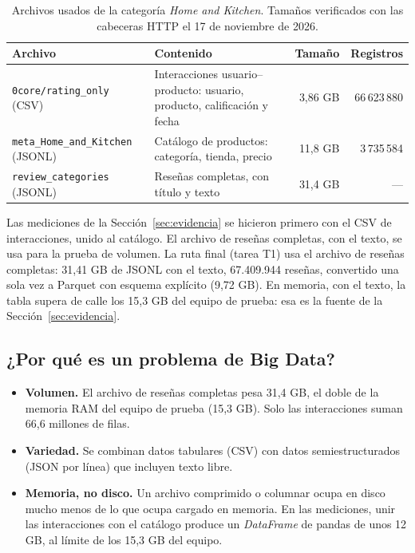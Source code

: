 \documentclass[11pt,a4paper]{article}
\begin{document}
\begin{table}[H]
\centering
\caption{Archivos usados de la categoría \emph{Home and Kitchen}. Tamaños verificados con
las cabeceras HTTP el 17 de noviembre de 2026.}
\label{tab:datos}
\begin{tabularx}{\textwidth}{lXrr}
\toprule
Archivo & Contenido & Tamaño & Registros \\
\midrule
\texttt{0core/rating\_only} (CSV) & Interacciones usuario--producto: usuario, producto, calificación y fecha & 3,86 GB & 66\,623\,880 \\
\texttt{meta\_Home\_and\_Kitchen} (JSONL) & Catálogo de productos: categoría, tienda, precio & 11,8 GB & 3\,735\,584 \\
\texttt{review\_categories} (JSONL) & Reseñas completas, con título y texto & 31,4 GB & --- \\
\bottomrule
\end{tabularx}
\end{table}

Las mediciones de la Sección~\ref{sec:evidencia} se hicieron primero con el CSV de
interacciones, unido al catálogo. El archivo de reseñas completas, con el texto, se usa
para la prueba de volumen. La ruta final (tarea T1) usa el archivo de reseñas completas:
31,41 GB de JSONL con el texto, 67.409.944 reseñas, convertido una sola vez a Parquet con
esquema explícito (9,72 GB). En memoria, con el texto, la tabla supera de calle los 15,3 GB
del equipo de prueba: esa es la fuente de la Sección~\ref{sec:evidencia}.

\subsection{¿Por qué es un problema de Big Data?}

\begin{itemize}
  \item \textbf{Volumen.} El archivo de reseñas completas pesa 31,4 GB, el doble de la
  memoria RAM del equipo de prueba (15,3 GB). Solo las interacciones suman 66,6 millones de
  filas.
  \item \textbf{Variedad.} Se combinan datos tabulares (CSV) con datos semiestructurados
  (JSON por línea) que incluyen texto libre.
  \item \textbf{Memoria, no disco.} Un archivo comprimido o columnar ocupa en disco mucho
  menos de lo que ocupa cargado en memoria. En las mediciones, unir las interacciones con el
  catálogo produce un \emph{DataFrame} de pandas de unos 12 GB, al límite de los 15,3 GB del
  equipo.
\end{itemize}
\end{document}
